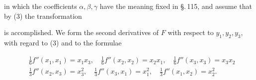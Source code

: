 in which the coefficients $\alpha, \beta, \gamma$ have the meaning fixed in \S.\,115, and assume that by (3) the transformation


is accomplished. We form the second derivatives of $F$ with respect to $y_1, y_2, y_3$, with regard to (3) and to the formulae

\[
\begin{aligned}
&\tfrac{1}{6} f''(x_1, x_1) = x_1 x_3, \quad \tfrac{1}{6} f''(x_2, x_2) = x_2 x_1, \quad \tfrac{1}{6} f''(x_3, x_3) = x_3 x_2 \\
&\tfrac{1}{3} f''(x_2, x_3) = x_3^2, \quad \tfrac{1}{3} f''(x_3, x_1) = x_1^2, \quad \tfrac{1}{3} f''(x_1, x_2) = x_2^2.
\end{aligned}
\]
